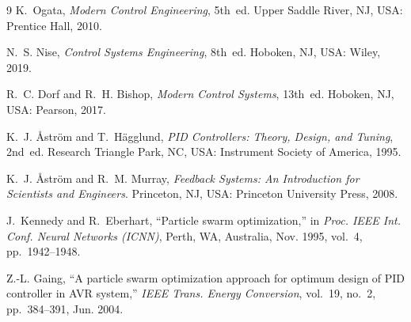 \documentclass[11pt,a4paper]{article}
\begin{document}
\begin{thebibliography}{9}
  K.~Ogata, \textit{Modern Control Engineering}, 5th~ed. Upper Saddle River, NJ, USA: Prentice Hall, 2010.

  N.~S. Nise, \textit{Control Systems Engineering}, 8th~ed. Hoboken, NJ, USA: Wiley, 2019.

  R.~C. Dorf and R.~H. Bishop, \textit{Modern Control Systems}, 13th~ed. Hoboken, NJ, USA: Pearson, 2017.

  K.~J. \AA str\"om and T.~H\"agglund, \textit{PID Controllers: Theory, Design, and Tuning}, 2nd~ed. Research Triangle Park, NC, USA: Instrument Society of America, 1995.

  K.~J. \AA str\"om and R.~M. Murray, \textit{Feedback Systems: An Introduction for Scientists and Engineers}. Princeton, NJ, USA: Princeton University Press, 2008.

  J.~Kennedy and R.~Eberhart, ``Particle swarm optimization,'' in \textit{Proc. IEEE Int. Conf. Neural Networks (ICNN)}, Perth, WA, Australia, Nov. 1995, vol.~4, pp.~1942--1948.

  Z.-L. Gaing, ``A particle swarm optimization approach for optimum design of PID controller in AVR system,'' \textit{IEEE Trans. Energy Conversion}, vol.~19, no.~2, pp.~384--391, Jun. 2004.
\end{thebibliography}
\end{document}
